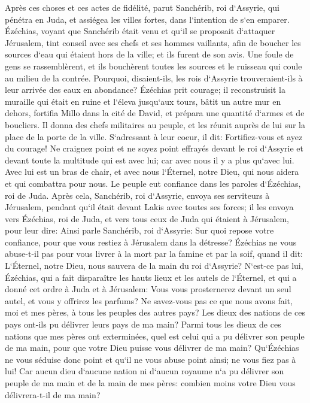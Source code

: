 \verse Après ces choses et ces actes de fidélité, parut Sanchérib, roi d`Assyrie, qui pénétra en Juda, et assiégea les villes fortes, dans l`intention de s`en emparer. 
\verse Ézéchias, voyant que Sanchérib était venu et qu`il se proposait d`attaquer Jérusalem, 
\verse tint conseil avec ses chefs et ses hommes vaillants, afin de boucher les sources d`eau qui étaient hors de la ville; et ils furent de son avis. 
\verse Une foule de gens se rassemblèrent, et ils bouchèrent toutes les sources et le ruisseau qui coule au milieu de la contrée. Pourquoi, disaient-ils, les rois d`Assyrie trouveraient-ils à leur arrivée des eaux en abondance? 
\verse Ézéchias prit courage; il reconstruisit la muraille qui était en ruine et l`éleva jusqu`aux tours, bâtit un autre mur en dehors, fortifia Millo dans la cité de David, et prépara une quantité d`armes et de boucliers. 
\verse Il donna des chefs militaires au peuple, et les réunit auprès de lui sur la place de la porte de la ville. S`adressant à leur coeur, il dit: 
\verse Fortifiez-vous et ayez du courage! Ne craignez point et ne soyez point effrayés devant le roi d`Assyrie et devant toute la multitude qui est avec lui; car avec nous il y a plus qu`avec lui. 
\verse Avec lui est un bras de chair, et avec nous l`Éternel, notre Dieu, qui nous aidera et qui combattra pour nous. Le peuple eut confiance dans les paroles d`Ézéchias, roi de Juda. 
\verse Après cela, Sanchérib, roi d`Assyrie, envoya ses serviteurs à Jérusalem, pendant qu`il était devant Lakis avec toutes ses forces; il les envoya vers Ézéchias, roi de Juda, et vers tous ceux de Juda qui étaient à Jérusalem, pour leur dire: 
\verse Ainsi parle Sanchérib, roi d`Assyrie: Sur quoi repose votre confiance, pour que vous restiez à Jérusalem dans la détresse? 
\verse Ézéchias ne vous abuse-t-il pas pour vous livrer à la mort par la famine et par la soif, quand il dit: L`Éternel, notre Dieu, nous sauvera de la main du roi d`Assyrie? 
\verse N`est-ce pas lui, Ézéchias, qui a fait disparaître les hauts lieux et les autels de l`Éternel, et qui a donné cet ordre à Juda et à Jérusalem: Vous vous prosternerez devant un seul autel, et vous y offrirez les parfums? 
\verse Ne savez-vous pas ce que nous avons fait, moi et mes pères, à tous les peuples des autres pays? Les dieux des nations de ces pays ont-ils pu délivrer leurs pays de ma main? 
\verse Parmi tous les dieux de ces nations que mes pères ont exterminées, quel est celui qui a pu délivrer son peuple de ma main, pour que votre Dieu puisse vous délivrer de ma main? 
\verse Qu`Ézéchias ne vous séduise donc point et qu`il ne vous abuse point ainsi; ne vous fiez pas à lui! Car aucun dieu d`aucune nation ni d`aucun royaume n`a pu délivrer son peuple de ma main et de la main de mes pères: combien moins votre Dieu vous délivrera-t-il de ma main? 
